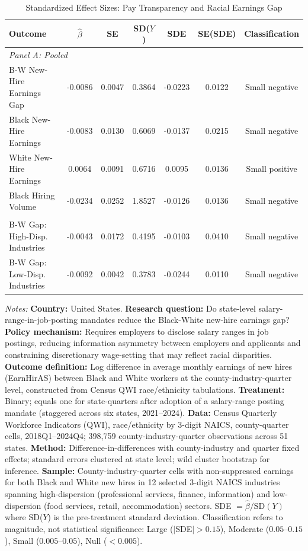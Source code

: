 \begin{table}[t]
\centering
\caption{Standardized Effect Sizes: Pay Transparency and Racial Earnings Gap}
\label{tab:sde}
\footnotesize
\begin{tabular}{lcccccc}
\toprule
Outcome & $\hat{\beta}$ & SE & SD($Y$) & SDE & SE(SDE) & Classification \\
\midrule
\multicolumn{7}{l}{\textit{Panel A: Pooled}} \\
\addlinespace
B-W New-Hire Earnings Gap & -0.0086 & 0.0047 & 0.3864 & -0.0223 & 0.0122 & Small negative \\
Black New-Hire Earnings & -0.0083 & 0.0130 & 0.6069 & -0.0137 & 0.0215 & Small negative \\
White New-Hire Earnings & 0.0064 & 0.0091 & 0.6716 & 0.0095 & 0.0136 & Small positive \\
Black Hiring Volume & -0.0234 & 0.0252 & 1.8527 & -0.0126 & 0.0136 & Small negative \\
\addlinespace
\multicolumn{7}{l}{\textit{Panel B: Heterogeneous (Sample Splits by Industry Dispersion)}} \\
\addlinespace
B-W Gap: High-Disp. Industries & -0.0043 & 0.0172 & 0.4195 & -0.0103 & 0.0410 & Small negative \\
B-W Gap: Low-Disp. Industries & -0.0092 & 0.0042 & 0.3783 & -0.0244 & 0.0110 & Small negative \\
\bottomrule
\end{tabular}
\begin{tablenotes}
\scriptsize
\item \textit{Notes:} \textbf{Country:} United States. \textbf{Research question:} Do state-level salary-range-in-job-posting mandates reduce the Black-White new-hire earnings gap? \textbf{Policy mechanism:} Requires employers to disclose salary ranges in job postings, reducing information asymmetry between employers and applicants and constraining discretionary wage-setting that may reflect racial disparities. \textbf{Outcome definition:} Log difference in average monthly earnings of new hires (EarnHirAS) between Black and White workers at the county-industry-quarter level, constructed from Census QWI race/ethnicity tabulations. \textbf{Treatment:} Binary; equals one for state-quarters after adoption of a salary-range posting mandate (staggered across six states, 2021--2024). \textbf{Data:} Census Quarterly Workforce Indicators (QWI), race/ethnicity by 3-digit NAICS, county-quarter cells, 2018Q1--2024Q4; 398,759 county-industry-quarter observations across 51 states. \textbf{Method:} Difference-in-differences with county-industry and quarter fixed effects; standard errors clustered at state level; wild cluster bootstrap for inference. \textbf{Sample:} County-industry-quarter cells with non-suppressed earnings for both Black and White new hires in 12 selected 3-digit NAICS industries spanning high-dispersion (professional services, finance, information) and low-dispersion (food services, retail, accommodation) sectors. SDE $= \hat{\beta} / \text{SD}(Y)$ where SD($Y$) is the pre-treatment standard deviation. Classification refers to magnitude, not statistical significance: Large ($|$SDE$| > 0.15$), Moderate ($0.05$--$0.15$), Small ($0.005$--$0.05$), Null ($< 0.005$).
\end{tablenotes}
\end{table}

